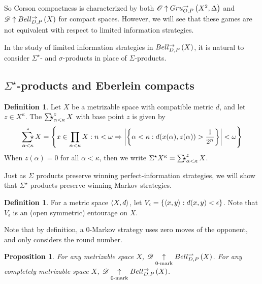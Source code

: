 \documentclass{amsart}
\newtheorem{proposition}[theorem]{Proposition}
\theoremstyle{definition}
\newtheorem{definition}[theorem]{Definition}
\begin{document}
  So Corson compactness is characterized by both
  \(\mathscr{O}\uparrow Gru_{O,P}^{\to}\left({X^2},{\Delta}\right)\) and
  \(\mathscr{D}\uparrow Bell_{D,P}^{\to}\left({X}\right)\) for compact spaces.
  However, we will see that these games are not
  equivalent with respect to limited information strategies.

  In the study of limited information strategies in \(Bell_{D,P}^{\to}\left({X}\right)\),
  it is natural to consider \(\Sigma^\star\)- and \(\sigma\)-products
  in place of \(\Sigma\)-products.


\subsection{\(\Sigma^\star\)-products and Eberlein compacts}

  \begin{definition}
    Let \(X\) be a metrizable space with
    compatible metric \(d\), and let \(z\in X^\kappa\).
    The 
    \(\SigmaStarProd_{\alpha<\kappa}^{z}X\)
    with base point \(z\) is given by
    \[
      \SigmaStarProd_{\alpha<\kappa}^{z}X
        =
      \left\{
        x\in \prod_{\alpha<\kappa}X
      :
        n<\omega
      \Rightarrow
        \left|\left\{
          \alpha<\kappa:d(x(\alpha),z(\alpha))>\frac{1}{2^n}
        \right\}\right|
        <\omega
      \right\}
    \]
    When \(z(\alpha)=0\) for all \(\alpha<\kappa\),
    then we write
    \(\SigmaStarPower{X}{\kappa}=\SigmaStarProd_{\alpha<\kappa}^z X\).
  \end{definition}

  Just as \(\Sigma\) products preserve winning perfect-information strategies,
  we will show that \(\Sigma^\star\) products preserve winning
  Markov strategies.

  \begin{definition}
    For a metric space \(\langle X,d\rangle\), let
    \(V_\epsilon=\{\langle x,y\rangle:d(x,y)<\epsilon\}\). Note that \(V_\epsilon\)
    is an (open symmetric) entourage on \(X\).
  \end{definition}

  Note that by definition, a \(0\)-Markov strategy uses zero moves of
  the opponent, and only considers the round number.

  \begin{proposition}
    For any metrizable space \(X\),
    \(\mathscr{D}\underset{0\text{-mark}}{\uparrow}Bell_{D,P}^{\rightharpoonup}\left({X}\right)\).
    For any completely metrizable space \(X\),
    \(\mathscr{D}\underset{0\text{-mark}}{\uparrow}Bell_{D,P}^{\to}\left({X}\right)\).
  \end{proposition}
\end{document}

